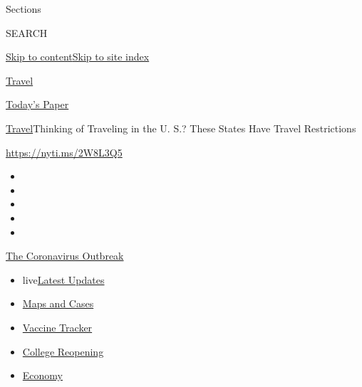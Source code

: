 Sections

SEARCH

\protect\hyperlink{site-content}{Skip to
content}\protect\hyperlink{site-index}{Skip to site index}

\href{https://www.nytimes.com/section/travel}{Travel}

\href{https://myaccount.nytimes.com/auth/login?response_type=cookie\&client_id=vi}{}

\href{https://www.nytimes.com/section/todayspaper}{Today's Paper}

\href{/section/travel}{Travel}\textbar{}Thinking of Traveling in the U.
S.? These States Have Travel Restrictions

\url{https://nyti.ms/2W8L3Q5}

\begin{itemize}
\item
\item
\item
\item
\item
\end{itemize}

\href{https://www.nytimes.com/news-event/coronavirus?action=click\&pgtype=Article\&state=default\&region=TOP_BANNER\&context=storylines_menu}{The
Coronavirus Outbreak}

\begin{itemize}
\tightlist
\item
  live\href{https://www.nytimes.com/2020/08/04/world/coronavirus-cases.html?action=click\&pgtype=Article\&state=default\&region=TOP_BANNER\&context=storylines_menu}{Latest
  Updates}
\item
  \href{https://www.nytimes.com/interactive/2020/us/coronavirus-us-cases.html?action=click\&pgtype=Article\&state=default\&region=TOP_BANNER\&context=storylines_menu}{Maps
  and Cases}
\item
  \href{https://www.nytimes.com/interactive/2020/science/coronavirus-vaccine-tracker.html?action=click\&pgtype=Article\&state=default\&region=TOP_BANNER\&context=storylines_menu}{Vaccine
  Tracker}
\item
  \href{https://www.nytimes.com/2020/08/02/us/covid-college-reopening.html?action=click\&pgtype=Article\&state=default\&region=TOP_BANNER\&context=storylines_menu}{College
  Reopening}
\item
  \href{https://www.nytimes.com/live/2020/08/04/business/stock-market-today-coronavirus?action=click\&pgtype=Article\&state=default\&region=TOP_BANNER\&context=storylines_menu}{Economy}
\end{itemize}

